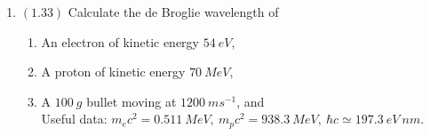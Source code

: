 \documentclass[fleqn]{article}
\begin{document}
\begin{enumerate}
    \item $(\mathbf{1.33})$ Calculate the de Broglie wavelength of
      \begin{enumerate}
        \item An electron of kinetic energy $54 ~ eV$, 
        \item A proton of kinetic energy $70 ~ MeV$, 
        \item A $100 ~ g$ bullet moving at $1200 ~ ms^{-1}$, and \\

        Useful data: $m_ec^2=0.511 ~ MeV, ~ m_pc^2=938.3 ~ MeV, ~ \hbar c \simeq 197.3 ~ eV ~ nm$.
      \end{enumerate}

  \end{enumerate}
\end{document}
